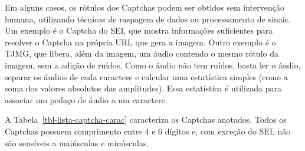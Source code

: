 \documentclass[12pt,twoside,brazilian]{book}
\begin{document}
Em alguns casos, os rótulos dos Captchas podem ser obtidos sem
intervenção humana, utilizando técnicas de raspagem de dados ou
processamento de sinais. Um exemplo é o Captcha do SEI, que mostra
informações suficientes para resolver o Captcha na própria URL que gera
a imagem. Outro exemplo é o TJMG, que libera, além da imagem, um áudio
contendo o mesmo rótulo da imagem, sem a adição de ruídos. Como o áudio
não tem ruídos, basta ler o áudio, separar os áudios de cada caractere e
calcular uma estatística simples (como a soma dos valores absolutos das
amplitudes). Essa estatística é utilizada para associar um pedaço de
áudio a um caractere.

A Tabela~\ref{tbl-lista-captcha-carac} caracteriza os Captchas anotados.
Todos os Captchas possuem comprimento entre 4 e 6 dígitos e, com exceção
do SEI, não são sensíveis a maiúsculas e minúsculas.
\end{document}
